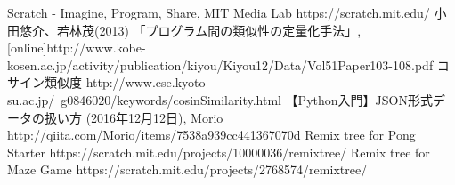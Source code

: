 \documentclass[twocolumn,9pt,a4paper]{jsarticle}
\begin{document}
\begin{thebibliography}{6}
\small
{}Scratch - Imagine, Program, Share, MIT Media Lab https://scratch.mit.edu/
小田悠介、若林茂(2013) 「プログラム間の類似性の定量化手法」,[online]http://www.kobe-kosen.ac.jp/activity/publication/kiyou/Kiyou12/Data/Vol51Paper103-108.pdf
 コサイン類似度 http://www.cse.kyoto-su.ac.jp/~g0846020/keywords/cosinSimilarity.html
【Python入門】JSON形式データの扱い方 (2016年12月12日), Morio http://qiita.com/Morio/items/7538a939cc441367070d
Remix tree for Pong Starter https://scratch.mit.edu/projects/10000036/remixtree/
Remix tree for Maze Game https://scratch.mit.edu/projects/2768574/remixtree/

\end{thebibliography}

%
%
\end{document}
